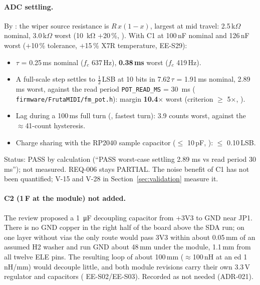\paragraph{ADC settling.} By : the wiper source resistance is
$R\,x(1-x)$, largest at mid travel: 2.5\,k$\Omega$ nominal, 3.0\,k$\Omega$ worst
(\qty{10}{\kilo\ohm} $+$20\,\%, ). With C1 at 100\,nF nominal and
126\,nF worst ($+$10\,\% tolerance, $+$15\,\% X7R temperature,  EE-S29):
\begin{itemize}[noitemsep]
  \item $\tau$ = 0.25\,ms nominal (\(f_c\) 637\,Hz), \textbf{0.38\,ms} worst (\(f_c\) 419\,Hz).
  \item A full-scale step settles to $\frac12$\,LSB at 10 bits in 7.62\,$\tau$ =
        1.91\,ms nominal, 2.89\,ms worst, against the read period
        \texttt{POT\_READ\_MS} = \qty{30}{\milli\second} (
        \nolinkurl{firmware/FrutaMIDI/fm_pot.h}): margin \textbf{10.4$\times$} worst
        (criterion $\ge$ 5$\times$, ).
  \item Lag during a 100\,ms full turn (, fastest turn): 3.9 counts
        worst, against the $\approx$41-count hysteresis.
  \item Charge sharing with the RP2040 sample capacitor ($\le$ 10\,pF,
        ): $\le$ 0.10\,LSB.
\end{itemize}
Status: PASS by calculation (``PASS worst-case settling 2.89 ms vs read period 30
ms''); not measured. REQ-006 stays PARTIAL. The noise benefit of C1 has not been
quantified; V-15 and V-28 in Section~\ref{sec:validation} measure it.

\paragraph{C2 (1\,\textmu F at the module) not added.} The review proposed a
\qty{1}{\micro\farad} decoupling capacitor from +3V3 to GND near JP1. There is no GND
copper in the right half of the board above the SDA run; on one layer without vias
the only route would pass 3V3 within about 0.05\,mm of an assumed H2 washer and
run GND about 48\,mm under the module, 1.1\,mm from all twelve ELE pins. The
resulting loop of about 100\,mm ($\approx$100\,nH at an ed 1\,nH/mm)
would decouple little, and both module revisions carry their own 3.3\,V regulator and
capacitors ( EE-S02/EE-S03). Recorded as not needed (ADR-021).

